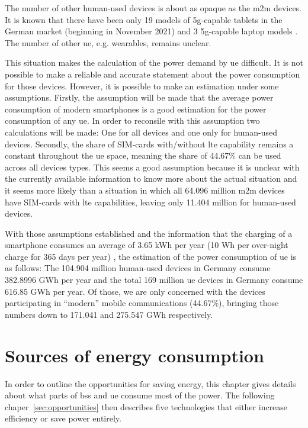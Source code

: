\documentclass[11pt,a4paper]{article}
\begin{document}
The number of other human-used devices is about as opaque as the \acrshort{m2m} devices.
It is known that there have been only 19 models of \acrshort{5g}-capable tablets in the German market (beginning in November 2021) \citep{tabletmodels} and 3 \acrshort{5g}-capable laptop models \citep{laptopmodels}.
The number of other \acrlong{ue}, e.g. wearables, remains unclear.

This situation makes the calculation of the power demand by \acrlong{ue} difficult.
It is not possible to make a reliable and accurate statement about the power consumption for those devices.
However, it is possible to make an estimation under some assumptions.
Firstly, the assumption will be made that the average power consumption of modern smartphones is a good estimation for the power consumption of any \acrshort{ue}.
In order to reconsile with this assumption two calculations will be made: One for all devices and one only for human-used devices.
Secondly, the share of SIM-cards with/without \acrshort{lte} capability remains a constant throughout the \acrlong{ue} space, meaning the share of 44.67\% can be used across all devices types.
This seems a good assumption because it is unclear with the currently available information to know more about the actual situation and it seems more likely than a situation in which all 64.096 million \acrshort{m2m} devices have SIM-cards with \acrshort{lte} capabilities, leaving only 11.404 million for human-used devices.


With those assumptions established and the information that the charging of a smartphone consumes an average of 3.65 kWh per year (10 Wh per over-night charge for 365 days per year) \citep{smartphonecharge}, the estimation of the power consumption of \acrshort{ue} is as follows:
The 104.904 million human-used devices in Germany consume 382.8996 GWh per year and the total 169 million \acrshort{ue} devices in Germany consume 616.85 GWh per year.
Of those, we are only concerned with the devices participating in \enquote{modern} mobile communications (44.67\%), bringing those numbers down to 171.041 and 275.547 GWh respectively.

\section{Sources of energy consumption}\label{sec:energyconsumption}
In order to outline the opportunities for saving energy, this chapter gives details about what parts of \acrlong{bs}s and \acrlong{ue} consume most of the power.
The following chaper~\ref{sec:opportunities} then describes five technologies that either increase efficiency or save power entirely.
\end{document}
